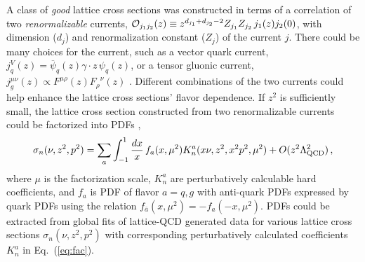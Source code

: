 A class of {\it good} lattice cross sections was constructed in terms of a correlation of two {\it renormalizable} currents, ${\cal O}_{j_1j_2}(z)\equiv z^{d_{j_1}+d_{j_2}-2} Z_{j_1} Z_{j_2}\, j_1(z) j_2(0)$, with dimension ($d_j$) and renormalization constant ($Z_j$) of the current $j$.  There could be many choices for the current, such as a vector quark current, $j_q^V(z) = \overline{\psi}_q(z)\gamma\cdot{z}\, {\psi}_{q}(z)$, or a tensor gluonic current, $j_g^{\mu\nu}(z)\propto F^{\mu\rho}(z){F_{\rho}}^\nu(z)$ \cite{Ma:2017pxb}.  Different combinations of the two currents could help enhance the lattice cross sections' flavor dependence.  If $z^2$ is sufficiently small, the lattice cross section constructed from two renormalizable currents could be factorized into PDFs \cite{Ma:2017pxb},
\begin{equation}\label{eq:fac}
{\sigma}_{n}(\nu,z^2,p^2)=\sum_{a}\int_{-1}^1 \frac{dx}{x}\, f_{a}(x,\mu^2) 
K_{{n}}^{a}(x\nu,z^2,x^2p^2,\mu^2) +O(z^2\Lambda_{\rm QCD}^2)\, ,
\end{equation}
where $\mu$ is the factorization scale, $K_n^{a}$ are perturbatively calculable hard coefficients, and $f_{a}$ is PDF of flavor $a=q,g$ with anti-quark PDFs expressed by quark PDFs using the relation $f_{\bar{a}}(x,\mu^2)=-f_{{a}}(-x,\mu^2)$.  PDFs could be extracted from global fits of lattice-QCD generated data for various lattice cross sections $\sigma_{n}(\nu,z^2,p^2)$ with corresponding perturbatively calculated coefficients $K_n^{a}$ in Eq.~(\ref{eq:fac}).

